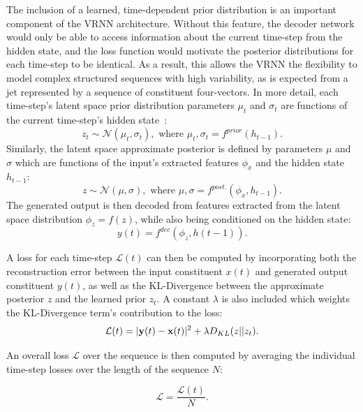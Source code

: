 \documentclass[11pt, a4paper]{article}
\begin{document}
The inclusion of a learned, time-dependent prior distribution is an important component of the VRNN architecture. Without this feature, the decoder network would only be able to access information about the current time-step from the hidden state, and the loss function would motivate the posterior distributions for each time-step to be identical. As a result, this allows the VRNN the flexibility to model complex structured sequences with high variability, as is expected from a jet represented by a sequence of constituent four-vectors.
In more detail, each time-step's latent space prior distribution parameters $\mu_{t}$ and $\sigma_{t}$ are functions of the current time-step's hidden state~\cite{chung2016recurrent}:
\begin{equation}
	z_{t} \sim \mathcal{N}(\mu_{t}, \sigma_{t}), \text{ where } \mu_{t}, \sigma_{t} = f^{prior}(h_{t-1}).
\end{equation} 
Similarly, the latent space approximate posterior is defined by parameters $\mu$ and $\sigma$ which are functions of the input's extracted features $\phi_{x}$ and the hidden state $h_{t-1}$:
\begin{equation}
	z \sim \mathcal{N}(\mu, \sigma), \text{ where } \mu, \sigma = f^{post.}(\phi_{x}, h_{t-1}).
\end{equation} 
The generated output is then decoded from features extracted from the latent space distribution $\phi_{z} = f(z)$, while also being conditioned on the hidden state:
\begin{equation}
y(t) = f^{dec}(\phi_{z}, h(t-1)).
\end{equation} 

A loss for each time-step $\mathcal{L}(t)$ can then be computed by incorporating both the reconstruction error between the input constituent $x(t)$ and generated output constituent $y(t)$, as well as the KL-Divergence between the approximate posterior $z$ and the learned prior $z_{t}$. A constant $\lambda$ is also included which weights the KL-Divergence term's contribution to the loss:
\begin{equation}
\mathcal{L}(t) = |{\bf y}(t) - {\bf x}(t)|^{2} + \lambda D_{KL}(z||z_{t}).
\end{equation} 

An overall loss $\mathcal{L}$ over the sequence is then computed by averaging the individual time-step losses over the length of the sequence $N$:

\begin{equation}
\mathcal{L} = \frac{\mathcal{L}(t)}{N}.
\end{equation} 
\end{document}
